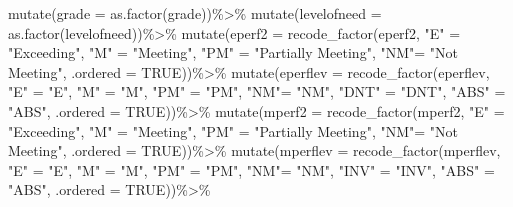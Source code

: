 \documentclass[
  letterpaper,
  DIV=11,
  numbers=noendperiod]{scrartcl}
\newenvironment{Shaded}{\begin{snugshade}}{\end{snugshade}}
\newcommand{\AttributeTok}[1]{\textcolor[rgb]{0.40,0.45,0.13}{#1}}
\newcommand{\ConstantTok}[1]{\textcolor[rgb]{0.56,0.35,0.01}{#1}}
\newcommand{\FunctionTok}[1]{\textcolor[rgb]{0.28,0.35,0.67}{#1}}
\newcommand{\NormalTok}[1]{\textcolor[rgb]{0.00,0.23,0.31}{#1}}
\newcommand{\OtherTok}[1]{\textcolor[rgb]{0.00,0.23,0.31}{#1}}
\newcommand{\SpecialCharTok}[1]{\textcolor[rgb]{0.37,0.37,0.37}{#1}}
\newcommand{\StringTok}[1]{\textcolor[rgb]{0.13,0.47,0.30}{#1}}
\begin{document}
\begin{Shaded}
\begin{Highlighting}[]
  \FunctionTok{mutate}\NormalTok{(}\AttributeTok{grade =} \FunctionTok{as.factor}\NormalTok{(grade))}\SpecialCharTok{\%\textgreater{}\%}
  \FunctionTok{mutate}\NormalTok{(}\AttributeTok{levelofneed =} \FunctionTok{as.factor}\NormalTok{(levelofneed))}\SpecialCharTok{\%\textgreater{}\%}
  \FunctionTok{mutate}\NormalTok{(}\AttributeTok{eperf2 =} \FunctionTok{recode\_factor}\NormalTok{(eperf2,}
                                   \StringTok{"E"} \OtherTok{=} \StringTok{"Exceeding"}\NormalTok{,}
                                   \StringTok{"M"} \OtherTok{=} \StringTok{"Meeting"}\NormalTok{,}
                                   \StringTok{"PM"} \OtherTok{=} \StringTok{"Partially Meeting"}\NormalTok{,}
                                   \StringTok{"NM"}\OtherTok{=} \StringTok{"Not Meeting"}\NormalTok{,}
                                  \AttributeTok{.ordered =} \ConstantTok{TRUE}\NormalTok{))}\SpecialCharTok{\%\textgreater{}\%}
  \FunctionTok{mutate}\NormalTok{(}\AttributeTok{eperflev =} \FunctionTok{recode\_factor}\NormalTok{(eperflev,}
                                   \StringTok{"E"} \OtherTok{=} \StringTok{"E"}\NormalTok{,}
                                   \StringTok{"M"} \OtherTok{=} \StringTok{"M"}\NormalTok{,}
                                   \StringTok{"PM"} \OtherTok{=} \StringTok{"PM"}\NormalTok{,}
                                   \StringTok{"NM"}\OtherTok{=} \StringTok{"NM"}\NormalTok{,}
                                   \StringTok{"DNT"} \OtherTok{=} \StringTok{"DNT"}\NormalTok{,}
                                   \StringTok{"ABS"} \OtherTok{=} \StringTok{"ABS"}\NormalTok{,}
                                  \AttributeTok{.ordered =} \ConstantTok{TRUE}\NormalTok{))}\SpecialCharTok{\%\textgreater{}\%}
    \FunctionTok{mutate}\NormalTok{(}\AttributeTok{mperf2 =} \FunctionTok{recode\_factor}\NormalTok{(mperf2,}
                                   \StringTok{"E"} \OtherTok{=} \StringTok{"Exceeding"}\NormalTok{,}
                                   \StringTok{"M"} \OtherTok{=} \StringTok{"Meeting"}\NormalTok{,}
                                   \StringTok{"PM"} \OtherTok{=} \StringTok{"Partially Meeting"}\NormalTok{,}
                                   \StringTok{"NM"}\OtherTok{=} \StringTok{"Not Meeting"}\NormalTok{,}
                                  \AttributeTok{.ordered =} \ConstantTok{TRUE}\NormalTok{))}\SpecialCharTok{\%\textgreater{}\%}
  \FunctionTok{mutate}\NormalTok{(}\AttributeTok{mperflev =} \FunctionTok{recode\_factor}\NormalTok{(mperflev,}
                                   \StringTok{"E"} \OtherTok{=} \StringTok{"E"}\NormalTok{,}
                                   \StringTok{"M"} \OtherTok{=} \StringTok{"M"}\NormalTok{,}
                                   \StringTok{"PM"} \OtherTok{=} \StringTok{"PM"}\NormalTok{,}
                                   \StringTok{"NM"}\OtherTok{=} \StringTok{"NM"}\NormalTok{,}
                                   \StringTok{"INV"} \OtherTok{=} \StringTok{"INV"}\NormalTok{,}
                                   \StringTok{"ABS"} \OtherTok{=} \StringTok{"ABS"}\NormalTok{,}
                                  \AttributeTok{.ordered =} \ConstantTok{TRUE}\NormalTok{))}\SpecialCharTok{\%\textgreater{}\%}


\end{Highlighting}
\end{Shaded}
\end{document}
